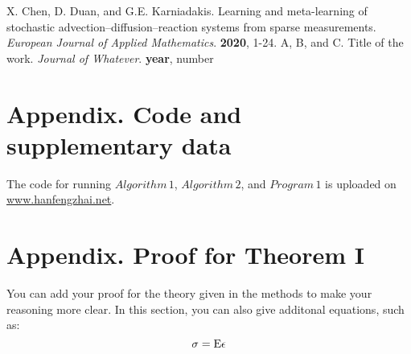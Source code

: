 \documentclass[preprint,12pt]{elsarticle}
\begin{document}
\begin{thebibliography}{99}



  X. Chen, D. Duan, and G.E. Karniadakis. Learning and meta-learning of stochastic advection–diffusion–reaction systems from sparse measurements. \emph{European Journal of Applied Mathematics}. \textbf{2020}, 1-24.
  A, B, and C. Title of the work. \emph{Journal of Whatever}. \textbf{year}, number
\end{thebibliography}





\section*{Appendix. Code and supplementary data}
The code for running \({Algorithm\,1}\), \({Algorithm\,2}\), and \({Program\,1}\) is uploaded on \url{www.hanfengzhai.net}.

\section*{Appendix. Proof for Theorem I}
\indent You can add your proof for the theory given in the methods to make your reasoning more clear. 
In this section, you can also give additonal equations, such as:
\begin{equation}
    \mathbf{\sigma} = \rm E \mathbf{\epsilon}\label{02}
    \end{equation}
\end{document}
